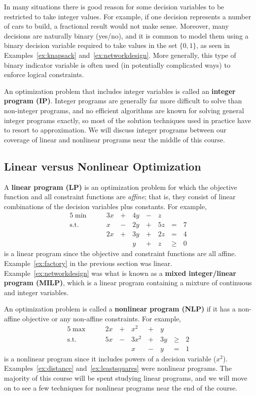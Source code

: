 \documentclass[11pt]{article}
\theoremstyle{definition} %
\begin{document}
In many situations there is good reason for some decision variables to be restricted to take integer values. For example, if one decision represents a number of cars to build, a fractional result would not make sense. Moreover, many decisions are naturally binary (yes/no), and it is common to model them using a binary decision variable required to take values in the set $\{0,1\}$, as seen in Examples~\ref{ex:knapsack} and~\ref{ex:networkdesign}. More generally, this type of binary indicator variable is often used (in potentially complicated ways) to enforce logical constraints.

An optimization problem that includes integer variables is called an \textbf{integer program (IP)}. Integer programs are generally far more difficult to solve than non-integer programs, and no efficient algorithms are known for solving general integer programs exactly, so most of the solution techniques used in practice have to resort to approximation. We will discuss integer programs between our coverage of linear and nonlinear programs near the middle of this course.

\subsection{Linear versus Nonlinear Optimization}
\label{subsec:nonlinear}

A \textbf{linear program (LP)} is an optimization problem for which the objective function and all constraint functions are \textit{affine}; that is, they consist of linear combinations of the decision variables plus constants. For example,
\begin{alignat*}{5}
	\min &\quad& 3x &\,+\,& 4y &\,-\,& z \\
	\mathrm{s.t.} && x &\,-\,& 2y &\,+\,& 5z &\,=\,& 7 \\
	&& 2x &\,+\,& 3y &\,+\,& 2z &\,=\,& 4 \\
	&& && y &\,+\,& z &\,\ge\,& 0
\end{alignat*}
is a linear program since the objective and constraint functions are all affine. Example~\ref{ex:factory} in the previous section was linear. Example~\ref{ex:networkdesign} was what is known as a \textbf{mixed integer/linear program (MILP)}, which is a linear program containing a mixture of continuous and integer variables.

An optimization problem is called a \textbf{nonlinear program (NLP)} if it has a non-affine objective or any non-affine constraints. For example,
\begin{alignat*}{5}
	\max &\quad& 2x &\,+\,& x^2 &\,+\,& y \\
	\mathrm{s.t.} && 5x &\,-\,& 3x^2 &\,+\,& 3y &\,\ge\,& 2 \\
	&& && x &\,-\,& y &\,=\,& 1
\end{alignat*}
is a nonlinear program since it includes powers of a decision variable ($x^2$). Examples~\ref{ex:distance} and~\ref{ex:leastsquares} were nonlinear programs. The majority of this course will be spent studying linear programs, and we will move on to see a few techniques for nonlinear programs near the end of the course.
\end{document}
